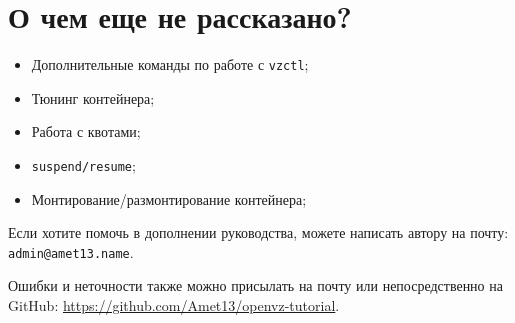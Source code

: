 \section{О чем еще не рассказано?}

\begin{itemize}
    \item Дополнительные команды по работе с \texttt{vzctl};
    \item Тюнинг контейнера;
    \item Работа с квотами;
    \item \texttt{suspend/resume};
    \item Монтирование/размонтирование контейнера;
\end{itemize}

Если хотите помочь в дополнении руководства, можете написать автору на почту: \texttt{admin@amet13.name}.

Ошибки и неточности также можно присылать на почту или непосредственно на GitHub: \url{https://github.com/Amet13/openvz-tutorial}.

\clearpage
